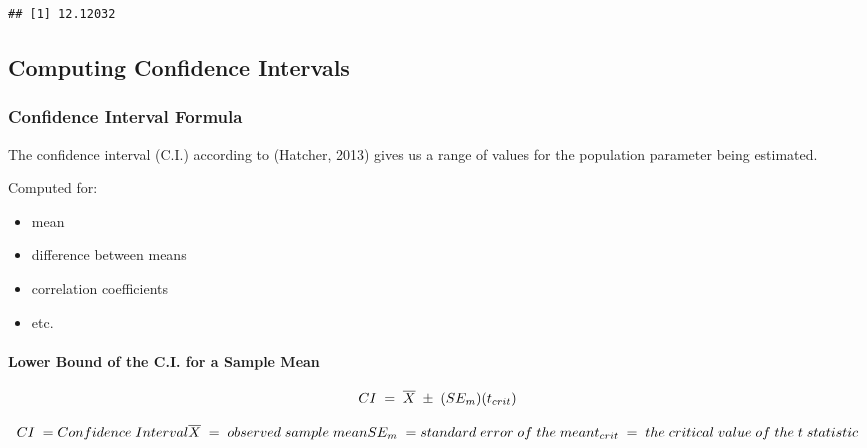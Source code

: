 \documentclass[
]{book}
\newenvironment{Shaded}{\begin{snugshade}}{\end{snugshade}}
\newcommand{\DocumentationTok}[1]{\textcolor[rgb]{0.56,0.35,0.01}{\textbf{\textit{#1}}}}
\newcommand{\FunctionTok}[1]{\textcolor[rgb]{0.13,0.29,0.53}{\textbf{#1}}}
\newcommand{\NormalTok}[1]{#1}
\newcommand{\OtherTok}[1]{\textcolor[rgb]{0.56,0.35,0.01}{#1}}
\newcommand{\SpecialCharTok}[1]{\textcolor[rgb]{0.81,0.36,0.00}{\textbf{#1}}}
\newcommand{\StringTok}[1]{\textcolor[rgb]{0.31,0.60,0.02}{#1}}
\providecommand{\tightlist}{%
  \setlength{\itemsep}{0pt}\setlength{\parskip}{0pt}}
\theoremstyle{definition}
\theoremstyle{definition}
\theoremstyle{definition}
\theoremstyle{definition}
\theoremstyle{remark}
\begin{document}
\begin{verbatim}
## [1] 12.12032
\end{verbatim}

\hypertarget{computing-confidence-intervals}{%
\subsection{Computing Confidence Intervals}\label{computing-confidence-intervals}}

\hypertarget{confidence-interval-formula}{%
\subsubsection{Confidence Interval Formula}\label{confidence-interval-formula}}

The confidence interval (C.I.) according to (Hatcher, 2013) gives us a range of values for the population parameter being estimated.

Computed for:

\begin{itemize}
\tightlist
\item
  mean
\item
  difference between means
\item
  correlation coefficients
\item
  etc.
\end{itemize}

\hypertarget{lower-bound-of-the-c.i.-for-a-sample-mean}{%
\paragraph{Lower Bound of the C.I. for a Sample Mean}\label{lower-bound-of-the-c.i.-for-a-sample-mean}}

\[\large
CI\;=\;\overline{X}\;\pm\;(SE_{m})(t_{crit})
\]

\[
CI\;=Confidence\;Interval
\\
\overline{X}\;=\;observed\;sample\;mean
\\
SE_{m}\;=standard\;error\;of\;the\;mean
\\
t_{crit}\;=\;the\;critical\;value\;of\;the\;t\;statistic
\]

\begin{Shaded}
\end{Shaded}
\end{document}
